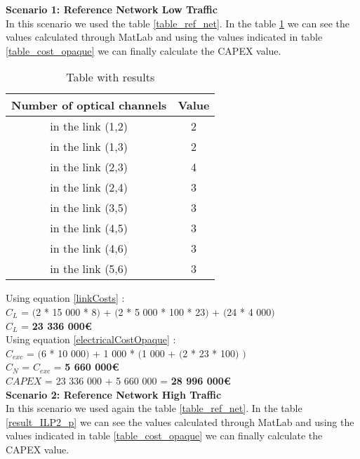 \textbf{Scenario 1: Reference Network Low Traffic} \label{Scenario1_opaque_p} \\

In this scenario we used the table \ref{table_ref_net}. In the table \ref{result_ILP1_p} we can see the values calculated through MatLab and using the values indicated in table \ref{table_cost_opaque} we can finally calculate the CAPEX value.
\begin{table}[h!]
\centering
\begin{tabular}{|| c | c||}
 \hline
 Number of optical channels & Value \\
 \hline\hline
 in the link (1,2) & 2 \\
 in the link (1,3) & 2 \\
 in the link (2,3) & 4 \\
 in the link (2,4) & 3 \\
 in the link (3,5) & 3 \\
 in the link (4,5) & 3 \\
 in the link (4,6) & 3 \\
 in the link (5,6) & 3 \\
 \hline
\end{tabular}
\caption{Table with results}
\label{result_ILP1_p}
\end{table}

Using equation \ref{linkCosts} : \\
$C_L$ = $($2 * 15 000 * 8$)$ + $($2 * 5 000 * 100 * 23$)$ + $($24 * 4 000$)$ \\
$C_L$ = \textbf{23 336 000\euro} \\

Using equation \ref{electricalCostOpaque} : \\
$C_{exc}$ = $($6 * 10 000$)$ + 1 000 * $($1 000 + $($2 * 23 * 100$)$ $)$ \\
$C_N$ = $C_{exc}$ = \textbf{5 660 000\euro} \\

$CAPEX$ = 23 336 000 + 5 660 000 = \textbf{28 996 000\euro}\\


\textbf{Scenario 2: Reference Network High Traffic} \label{Scenario2_opaque_p} \\

In this scenario we used again the table \ref{table_ref_net}. In the table \ref{result_ILP2_p} we can see the values calculated through MatLab and using the values indicated in table \ref{table_cost_opaque} we can finally calculate the CAPEX value.\\

